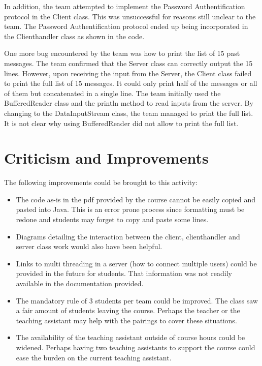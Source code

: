 \documentclass[11pt,letterpaper]{article}
\begin{document}
\medskip

In addition, the team attempted to implement the Password Authentification protocol in the Client class. This was unsuccessful for reasons still unclear to the team.  The Password Authentification protocol ended up being incorporated in the Clienthandler class as shown in the code.

\medskip

One more bug encountered by the team was how to print the list of 15 past messages.  The team confirmed that the Server class can correctly output the 15 lines. However, upon receiving the input from the Server, the Client class failed to print the full list of 15 messages. It could only print half of the messages or all of them but concatenated in a single line. The team initially used the BufferedReader class and the println method to read inputs from the server. By changing to the DataInputStream class, the team managed to print the full list. It is not clear why using BufferedReader did not allow to print the full list.

\section{Criticism and Improvements}
The following improvements could be brought to this activity:
\begin{itemize}
  \item The code as-is in the pdf provided by the course cannot be easily copied and pasted into Java. This is an error prone process since formatting must be redone and students may forget to copy and paste some lines.
  \item Diagrams detailing the interaction between the client, clienthandler and server class work would also have been helpful.
  \item Links to multi threading in a server (how to connect multiple users) could be provided in the future for students. That information was not readily available in the documentation provided.
   \item The mandatory rule of 3 students per team could be improved. The class saw a fair amount of students leaving the course. Perhaps the teacher or the teaching assistant may help with the pairings to cover these situations.
 \item The availability of the teaching assistant outside of course hours could be widened. Perhaps having two teaching assistants to support the course could ease the burden on the current teaching assistant.
\end{itemize}
\end{document}
